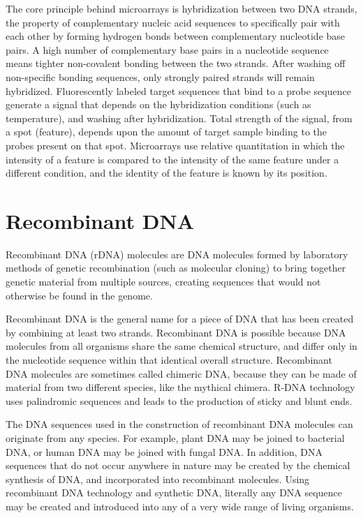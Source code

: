 The core principle behind microarrays is hybridization between two DNA strands, the property of complementary nucleic acid sequences to specifically pair with each other by forming hydrogen bonds between complementary nucleotide base pairs. A high number of complementary base pairs in a nucleotide sequence means tighter non-covalent bonding between the two strands. After washing off non-specific bonding sequences, only strongly paired strands will remain hybridized. Fluorescently labeled target sequences that bind to a probe sequence generate a signal that depends on the hybridization conditions (such as temperature), and washing after hybridization. Total strength of the signal, from a spot (feature), depends upon the amount of target sample binding to the probes present on that spot. Microarrays use relative quantitation in which the intensity of a feature is compared to the intensity of the same feature under a different condition, and the identity of the feature is known by its position.

\hypertarget{recombinant-dna}{%
\section{Recombinant DNA}\label{recombinant-dna}}

Recombinant DNA (rDNA) molecules are DNA molecules formed by laboratory methods of genetic recombination (such as molecular cloning) to bring together genetic material from multiple sources, creating sequences that would not otherwise be found in the genome.

Recombinant DNA is the general name for a piece of DNA that has been created by combining at least two strands. Recombinant DNA is possible because DNA molecules from all organisms share the same chemical structure, and differ only in the nucleotide sequence within that identical overall structure. Recombinant DNA molecules are sometimes called chimeric DNA, because they can be made of material from two different species, like the mythical chimera. R-DNA technology uses palindromic sequences and leads to the production of sticky and blunt ends.

The DNA sequences used in the construction of recombinant DNA molecules can originate from any species. For example, plant DNA may be joined to bacterial DNA, or human DNA may be joined with fungal DNA. In addition, DNA sequences that do not occur anywhere in nature may be created by the chemical synthesis of DNA, and incorporated into recombinant molecules. Using recombinant DNA technology and synthetic DNA, literally any DNA sequence may be created and introduced into any of a very wide range of living organisms.

